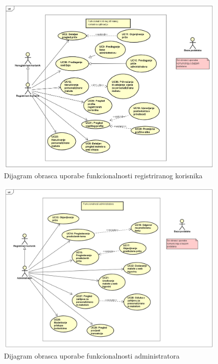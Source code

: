 					\begin{figure}
						\centering
						\includegraphics[scale=0.34]{"slike/Funkcionalnost registriranog korisnika"}
						\caption{Dijagram obrasca uporabe funkcionalnosti registriranog korisnika}
						\label{fig:funkcionalnost-registriranog-korisnika}
					\end{figure}
					
					\begin{figure}
						\centering
						\includegraphics[scale=0.34]{"slike/Funkcionalnost administratora"}
						\caption{Dijagram obrasca uporabe funkcionalnosti administratora}
						\label{fig:funkcionalnost-administratora}
					\end{figure}
					
